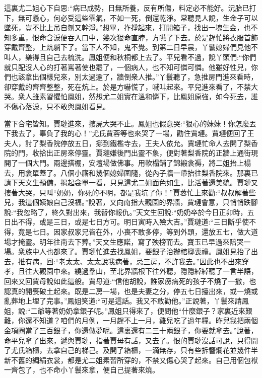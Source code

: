 \begin{parag}
    這裏尤二姐心下自思:“病已成勢，日無所養，反有所傷，料定必不能好。況胎已打下，無可懸心，何必受這些零氣，不如一死，倒還乾淨。常聽見人說，生金子可以墜死，豈不比上吊自刎又幹淨。”想畢，拃掙起來，打開箱子，找出一塊生金，也不知多重，恨命含淚便吞入口中，幾次狠命直脖，方嚥了下去。於是趕忙將衣服首飾穿戴齊整，上炕躺下了。當下人不知，鬼不覺。到第二日早晨，丫鬟媳婦們見他不叫人，樂得且自己去梳洗。鳳姐便和秋桐都上去了。平兒看不過，說丫頭們:“你們就只配沒人心的打著罵著使也罷了，一個病人，也不知可憐可憐。他雖好性兒，你們也該拿出個樣兒來，別太過逾了，牆倒衆人推。”丫鬟聽了，急推房門進來看時，卻穿戴的齊齊整整，死在炕上。於是方嚇慌了，喊叫起來。平兒進來看了，不禁大哭。衆人雖素習懼怕鳳姐，然想尤二姐實在溫和憐下，比鳳姐原強，如今死去，誰不傷心落淚，只不敢與鳳姐看見。
\end{parag}


\begin{parag}
    當下合宅皆知。賈璉進來，摟屍大哭不止。鳳姐也假意哭:“狠心的妹妹！你怎麼丟下我去了，辜負了我的心！”尤氏賈蓉等也來哭了一場，勸住賈璉。賈璉便回了王夫人，討了梨香院停放五日，挪到鐵檻寺去，王夫人依允。賈璉忙命人去開了梨香院的門，收拾出正房來停靈。賈璉嫌後門出靈不象，便對著梨香院的正牆上通街現開了一個大門。兩邊搭棚，安壇場做佛事。用軟榻鋪了錦緞衾褥，將二姐抬上榻去，用衾單蓋了。八個小廝和幾個媳婦圍隨，從內子牆一帶抬往梨香院來。那裏已請下天文生預備，揭起衾單一看，只見這尤二姐面色如生，比活著還美貌。賈璉又摟著大哭，只叫“奶奶，你死的不明，都是我坑了你！”賈蓉忙上來勸:“叔叔解著些兒，我這個姨娘自己沒福。”說著，又向南指大觀園的界牆，賈璉會意，只悄悄跌腳說:“我忽略了，終久對出來，我替你報仇。”天文生回說:“奶奶卒於今日正卯時，五日出不得，或是三日，或是七日方可。明日寅時入殮大吉。”賈璉道:“三日斷乎使不得，竟是七日。因家叔家兄皆在外，小喪不敢多停，等到外頭，還放五七，做大道場才掩靈。明年往南去下葬。”天文生應諾，寫了殃榜而去。寶玉已早過來陪哭一場。衆族中人也都來了。賈璉忙進去找鳳姐，要銀子治辦棺槨喪禮。鳳姐見抬了出去，推有病，回:“老太太、太太說我病著，忌三房，不許我去。”因此也不出來穿孝，且往大觀園中來。繞過羣山，至北界牆根下往外聽，隱隱綽綽聽了一言半語，回來又回賈母說如此這般。賈母道:“信他胡說，誰家癆病死的孩子不燒了一撒，也認真的開喪破土起來。既是二房一場，也是夫妻之分，停五七日擡出來，或一燒或亂葬地上埋了完事。”鳳姐笑道:“可是這話。我又不敢勸他。”正說著，丫鬟來請鳳姐，說:“二爺等著奶奶拿銀子呢。”鳳姐只得來了，便問他“什麼銀子？家裏近來艱難，你還不知道？咱們的月例，一月趕不上一月，雞兒吃了過年糧。昨兒我把兩個金項圈當了三百銀子，你還做夢呢。這裏還有二三十兩銀子，你要就拿去。”說著，命平兒拿了出來，遞與賈璉，指著賈母有話，又去了。恨的賈璉沒話可說，只得開了尤氏箱櫃，去拿自己的梯己。及開了箱櫃，一滴無存，只有些拆簪爛花並幾件半新不舊的綢絹衣裳，都是尤二姐素習所穿的，不禁又傷心哭了起來。自己用個包袱一齊包了，也不命小丫鬟來拿，便自己提著來燒。
\end{parag}


